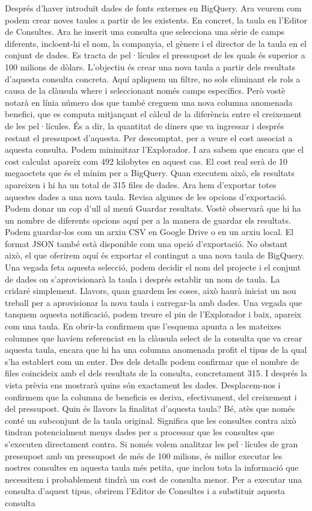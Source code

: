 \documentclass[12pt,longbibliography]{article}
\theoremstyle{definition}
\theoremstyle{remark}
\begin{document}
Després d'haver introduït dades de fonts externes en BigQuery. Ara veurem com podem crear noves taules a partir de les existents. En concret, la taula en l'Editor de Consultes. Ara he inserit una consulta que selecciona una sèrie de camps diferents, incloent-hi el nom, la companyia, el gènere i el director de la taula en el conjunt de dades. Es tracta de pel·lícules el pressupost de les quals és superior a 100 milions de dòlars. L'objectiu és crear una nova taula a partir dels resultats d'aquesta consulta concreta. Aquí apliquem un filtre, no sols eliminant els rols a causa de la clàusula where i seleccionant només camps específics. Però vostè notarà en línia número dos que també creguem una nova columna anomenada benefici, que es computa mitjançant el càlcul de la diferència entre el creixement de les pel·lícules. És a dir, la quantitat de diners que va ingressar i després restant el pressupost d'aquesta. Per descomptat, per a veure el cost associat a aquesta consulta. Podem minimitzar l'Explorador. I ara sabem que encara que el cost calculat apareix com 492 kilobytes en aquest cas. El cost real serà de 10 megaoctets que és el mínim per a BigQuery. Quan executem això, els resultats apareixen i hi ha un total de 315 files de dades. Ara hem d'exportar totes aquestes dades a una nova taula. Revisa algunes de les opcions d'exportació. Podem donar un cop d'ull al menú Guardar resultats. Vostè observarà que hi ha un nombre de diferents opcions aquí per a la manera de guardar els resultats. Podem guardar-los com un arxiu CSV en Google Drive o en un arxiu local. El format JSON també està disponible com una opció d'exportació. No obstant això, el que oferirem aquí és exportar el contingut a una nova taula de BigQuery. Una vegada feta aquesta selecció, podem decidir el nom del projecte i el conjunt de dades on s'aprovisionarà la taula i després establir un nom de taula. La cridaré simplement. Llavors, quan guardem les coses, això haurà iniciat un nou treball per a aprovisionar la nova taula i carregar-la amb dades. Una vegada que tanquem aquesta notificació, podem treure el pin de l'Explorador i baix, apareix com una taula. En obrir-la confirmem que l'esquema apunta a les mateixes columnes que havíem referenciat en la clàusula select de la consulta que va crear aquesta taula, encara que hi ha una columna anomenada profit el tipus de la qual s'ha establert com un enter. Des dels detalls podem confirmar que el nombre de files coincideix amb el dels resultats de la consulta, concretament 315. I després la vista prèvia ens mostrarà quins són exactament les dades. Desplacem-nos i confirmem que la columna de beneficis es deriva, efectivament, del creixement i del pressupost. Quin és llavors la finalitat d'aquesta taula? Bé, atès que només conté un subconjunt de la taula original. Significa que les consultes contra això tindran potencialment menys dades per a processar que les consultes que s'executen directament contra. Si només volem analitzar les pel·lícules de gran pressupost amb un pressupost de més de 100 milions, és millor executar les nostres consultes en aquesta taula més petita, que inclou tota la informació que necessitem i probablement tindrà un cost de consulta menor. Per a executar una consulta d'aquest tipus, obrirem l'Editor de Consultes i a substituir aquesta consulta 
\end{document}

